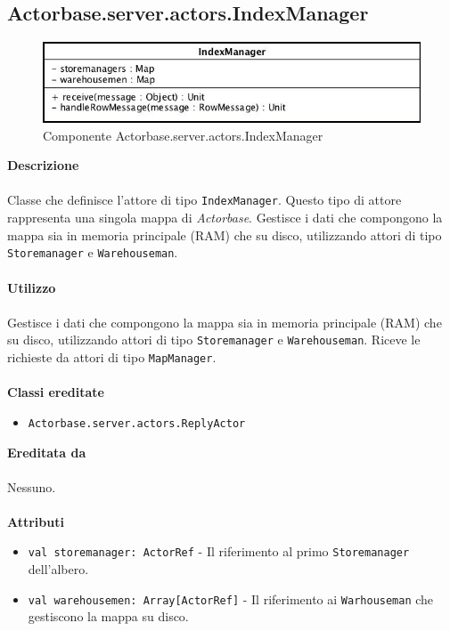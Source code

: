 \documentclass[a4paper]{article}
\begin{document}
	\subsection{Actorbase.server.actors.IndexManager}
		\begin{figure}[H]
			\centering
			\includegraphics[width=\textwidth]{Server/indexmanager.jpg}
			\caption{Componente Actorbase.server.actors.IndexManager}
		\end{figure}
		\textbf{Descrizione}
			\\ \\
			Classe che definisce l'attore di tipo \texttt{IndexManager}. Questo tipo di attore rappresenta una singola mappa di \emph{Actorbase}. Gestisce i dati che compongono la mappa sia in memoria principale (RAM) che su disco, utilizzando attori di tipo \texttt{Storemanager} e \texttt{Warehouseman}.
			\\ \\
		\textbf{Utilizzo}
			\\ \\
			Gestisce i dati che compongono la mappa sia in memoria principale (RAM) che su disco, utilizzando attori di tipo \texttt{Storemanager} e \texttt{Warehouseman}. Riceve le richieste da attori di tipo \texttt{MapManager}.
			\\ \\
		\textbf{Classi ereditate}
			\begin{itemize}
				\item \texttt{Actorbase.server.actors.ReplyActor}
			\end{itemize}
		\textbf{Ereditata da}
			\\ \\
			Nessuno.
			\\ \\
		\textbf{Attributi}
			\begin{itemize}
				\item \texttt{val storemanager: ActorRef} - Il riferimento al primo \texttt{Storemanager} dell'albero. 
				\item \texttt{val warehousemen: Array[ActorRef]} - Il riferimento ai \texttt{Warhouseman} che gestiscono la mappa su disco.
			\end{itemize}
\end{document}
